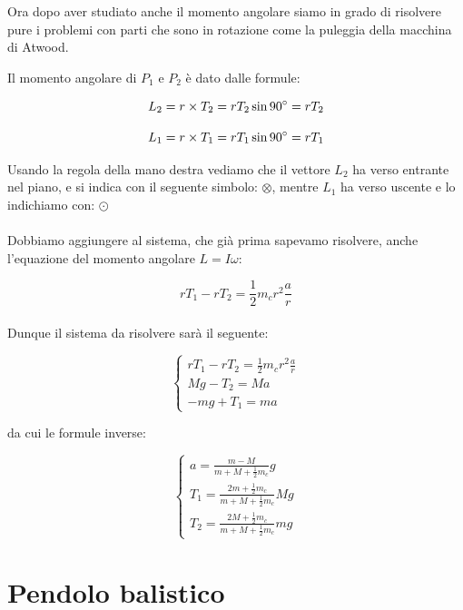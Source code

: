 Ora dopo aver studiato anche il momento angolare siamo in grado di risolvere pure i problemi con parti che sono in rotazione come la puleggia della macchina di Atwood.

Il momento angolare di $P_1$ e $P_2$ è dato dalle formule:

\begin{equation*}
    L_2 = r\times T_2 = rT_2\sin{90\ensuremath{^\circ}} = rT_2
\end{equation*}

\begin{equation*}
    L_1 = r\times T_1 = rT_1\sin{90\ensuremath{^\circ}} = rT_1
\end{equation*}

Usando la regola della mano destra vediamo che il vettore $L_2$ ha verso entrante nel piano, e si indica con il seguente simbolo: $\otimes$, mentre $L_1$ ha verso uscente e lo indichiamo con: $\odot$
\paragraph{}

Dobbiamo aggiungere al sistema, che già prima sapevamo risolvere, anche l'equazione del momento angolare $L = I\omega$:

\begin{equation}
    rT_1 - rT_2 = \frac{1}{2}m_c r^2 \frac{a}{r}
\end{equation}

\paragraph{}
Dunque il sistema da risolvere sarà il seguente:

$$
\begin{cases}
    rT_1 - rT_2 = \frac{1}{2}m_c r^2 \frac{a}{r}\\
    Mg - T_2  = Ma\\
    -mg + T_1  = ma
\end{cases}
$$

da cui le formule inverse:

$$
\begin{cases}
    a = \frac{m-M}{m+M+\frac{1}{2}m_c}g\\[10pt]
    T_1 = \frac{2m+\frac{1}{2}m_c}{m+M+\frac{1}{2}m_c}Mg\\[10pt]
    T_2 = \frac{2M+\frac{1}{2}m_c}{m+M+\frac{1}{2}m_c}mg
\end{cases}
$$


\section{Pendolo balistico}


